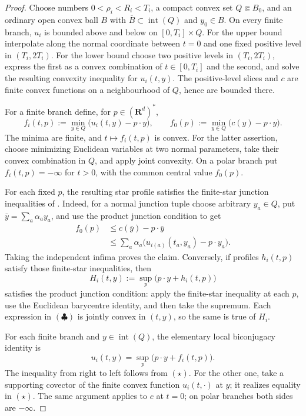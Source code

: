 \begin{proof}
Choose numbers \(0<\rho_i<R_i<T_i\), a compact convex set
\(Q\Subset B_0\), and an ordinary open convex ball \(B\) with
\(\overline B\subset\operatorname{int}(Q)\) and \(y_0\in B\).  On every
finite branch, \(u_i\) is bounded above and below on
\([0,T_i]\times Q\).  For the upper bound interpolate along the normal
coordinate between \(t=0\) and one fixed positive level in
\((T_i,2T_i)\).  For the lower bound choose two positive levels in
\((T_i,2T_i)\), express the
first as a convex combination of \(t\in[0,T_i]\) and the second, and solve
the resulting convexity inequality for \(u_i(t,y)\).  The positive-level
slices and \(c\) are finite convex functions on a neighbourhood of \(Q\),
hence are bounded there.

For a finite branch define, for \(p\in(\mathbf R^d)^*\),
\[
 f_i(t,p):=\min_{y\in Q}\bigl(u_i(t,y)-p\mathbin\cdot y\bigr),
 \qquad
 f_0(p):=\min_{y\in Q}\bigl(c(y)-p\mathbin\cdot y\bigr).
 \tag{\(\star\)}
\]
The minima are finite, and \(t\mapsto f_i(t,p)\) is convex.  For the
latter assertion, choose minimizing Euclidean variables at two normal
parameters, take their convex combination in \(Q\), and apply joint
convexity.  On a polar branch put \(f_i(t,p)=-\infty\) for \(t>0\), with
the common central value \(f_0(p)\).

For each fixed \(p\), the resulting star profile satisfies the finite-star
junction inequalities of .
Indeed, for a normal junction tuple choose arbitrary \(y_a\in Q\), put
\(\bar y=\sum_a\alpha_ay_a\), and use the product junction condition to get
\[
 \begin{split}
 f_0(p)
 &\leq c(\bar y)-p\mathbin\cdot\bar y\\
 &\leq\sum_a\alpha_a
       \bigl(u_{i(a)}(t_a,y_a)-p\mathbin\cdot y_a\bigr).
 \end{split}
 \tag{\(\star\star\)}
\]
Taking the independent infima proves the claim.  Conversely, if profiles
\(h_i(t,p)\) satisfy those finite-star inequalities, then
\[
 H_i(t,y):=\sup_p\bigl(p\mathbin\cdot y+h_i(t,p)\bigr)
 \tag{\(\clubsuit\)}
\]
satisfies the product junction condition: apply the finite-star inequality
at each \(p\), use the Euclidean barycentre identity, and then take the
supremum.  Each expression in \((\clubsuit)\) is jointly convex in
\((t,y)\), so the same is true of \(H_i\).

For each finite branch and \(y\in\operatorname{int}(Q)\), the elementary
local biconjugacy identity is
\[
 u_i(t,y)=\sup_p\bigl(p\mathbin\cdot y+f_i(t,p)\bigr).
 \tag{\(\heartsuit\)}
\]
The inequality from right to left follows from \((\star)\).  For the other
one, take a supporting covector of the finite convex function
\(u_i(t,\cdot)\) at \(y\); it realizes equality in \((\star)\).  The same
argument applies to \(c\) at \(t=0\); on polar branches both sides are
\(-\infty\).


\end{proof}
